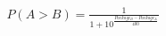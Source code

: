 \documentclass[preview]{standalone}
\begin{document}
\begin{align*}
P(A > B) = \frac{1}{1 + 10^{\frac{Package_B - Package_A}{400}}}
\end{align*}
\end{document}
